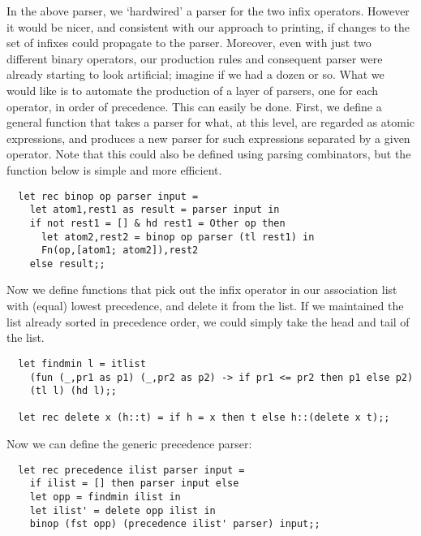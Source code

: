 In the above parser, we `hardwired' a parser for the two infix operators.
However it would be nicer, and consistent with our approach to printing, if
changes to the set of infixes could propagate to the parser. Moreover, even
with just two different binary operators, our production rules and consequent
parser were already starting to look artificial; imagine if we had a dozen or
so. What we would like is to automate the production of a layer of parsers, one
for each operator, in order of precedence. This can easily be done. First, we
define a general function that takes a parser for what, at this level, are
regarded as atomic expressions, and produces a new parser for such expressions
separated by a given operator. Note that this could also be defined using
parsing combinators, but the function below is simple and more efficient.

\begin{boxed}\begin{lstlisting}
  let rec binop op parser input =
    let atom1,rest1 as result = parser input in
    if not rest1 = [] & hd rest1 = Other op then
      let atom2,rest2 = binop op parser (tl rest1) in
      Fn(op,[atom1; atom2]),rest2
    else result;;
\end{lstlisting}\end{boxed}

Now we define functions that pick out the infix operator in our association
list with (equal) lowest precedence, and delete it from the list. If we
maintained the list already sorted in precedence order, we could simply take
the head and tail of the list.

\begin{boxed}\begin{lstlisting}
  let findmin l = itlist
    (fun (_,pr1 as p1) (_,pr2 as p2) -> if pr1 <= pr2 then p1 else p2)
    (tl l) (hd l);;

  let rec delete x (h::t) = if h = x then t else h::(delete x t);;
\end{lstlisting}\end{boxed}

\noindent Now we can define the generic precedence parser:

\begin{boxed}\begin{lstlisting}
  let rec precedence ilist parser input =
    if ilist = [] then parser input else
    let opp = findmin ilist in
    let ilist' = delete opp ilist in
    binop (fst opp) (precedence ilist' parser) input;;
\end{lstlisting}\end{boxed}

